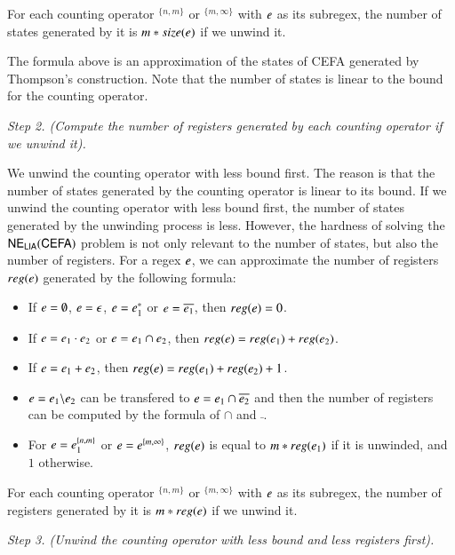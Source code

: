 For each counting operator $^{\{n,m\}}$ or $^{\{m,\infty\}}$ with $e$ as its subregex, the number of states generated by it is $m*size(e)$ if we unwind it.

The formula above is an approximation of the states of CEFA generated by Thompson's construction. Note that the number of states is linear to the bound for the counting operator.

\medskip
\noindent
\emph{Step 2. (Compute the number of registers generated by each counting operator if we unwind it).}

We unwind the counting operator with less bound first. The reason is that the number of states generated by the counting operator is linear to its bound. If we unwind the counting operator with less bound first, the number of states generated by the unwinding process is less. However, the hardness of solving the ${\sf NE_{LIA}(CEFA)}$ problem is not only relevant to the number of states, but also the number of registers. For a regex $e$, we can approximate the number of registers $reg(e)$ generated by the following formula:
\begin{itemize}
  \item If $e = \emptyset$, $e = \epsilon$, $e = e_1^*$ or $e = \overline{e_1}$, then $reg(e) = 0$.
  \item If $e = e_1\cdot e_2$ or $e = e_1 \cap e_2$, then $reg(e) = reg(e_1) + reg(e_2)$.
  \item If $e = e_1 + e_2$, then $reg(e) = reg(e_1) + reg(e_2) + 1$.
  \item $e = e_1 \backslash e_2$ can be transfered to $e = e_1 \cap \overline{e_2}$ and then the number of registers can be computed by the formula of $\cap$ and $\bar{}$.
  \item For $e = e_1^{\{n,m\}}$ or $e = e^{\{m, \infty\}}$, $reg(e)$ is equal to $m*reg(e_1)$ if it is unwinded, and $1$ otherwise.
\end{itemize}

For each counting operator $^{\{n,m\}}$ or $^{\{m,\infty\}}$ with $e$ as its subregex, the number of registers generated by it is $m*reg(e)$ if we unwind it.

\medskip
\noindent
\emph{Step 3. (Unwind the counting operator with less bound and less registers first).}

